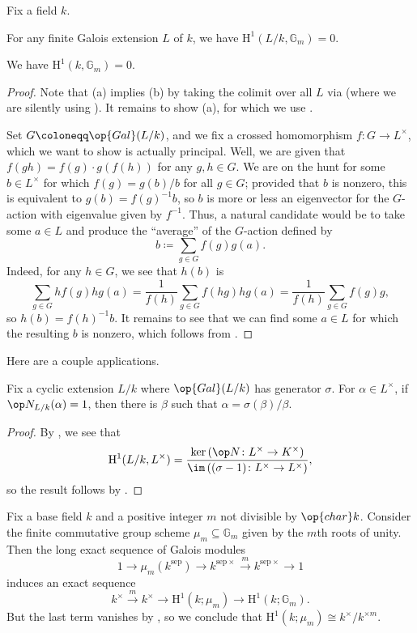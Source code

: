 \documentclass[notes.tex]{subfiles}
\begin{document}
\begin{theorem}[Hilbert 90] \label{thm:h90}
	Fix a field $k$.
	\begin{listalph}
		\item For any finite Galois extension $L$ of $k$, we have $\mathrm H^1(L/k,\mathbb G_m)=0$.
		\item We have $\mathrm H^1(k,\mathbb G_m)=0$.
	\end{listalph}
\end{theorem}
\begin{proof}
	Note that (a) implies (b) by taking the colimit over all $L$ via  (where we are silently using ). It remains to show (a), for which we use .
	
	Set $G\coloneqq\op{Gal}(L/k)$, and we fix a crossed homomorphism $f\colon G\to L^\times$, which we want to show is actually principal. Well, we are given that $f(gh)=f(g)\cdot g(f(h))$ for any $g,h\in G$. We are on the hunt for some $b\in L^\times$ for which $f(g)=g(b)/b$ for all $g\in G$; provided that $b$ is nonzero, this is equivalent to $g(b)=f(g)^{-1}b$, so $b$ is more or less an eigenvector for the $G$-action with eigenvalue given by $f^{-1}$. Thus, a natural candidate would be to take some $a\in L$ and produce the ``average'' of the $G$-action defined by
	\[b\coloneqq\sum_{g\in G}f(g)g(a).\]
	Indeed, for any $h\in G$, we see that $h(b)$ is
	\[\sum_{g\in G}hf(g)hg(a)=\frac1{f(h)}\sum_{g\in G}f(hg)hg(a)=\frac1{f(h)}\sum_{g\in G}f(g)g,\]
	so $h(b)=f\left(h\right)^{-1}b$. It remains to see that we can find some $a\in L$ for which the resulting $b$ is nonzero, which follows from .
\end{proof}
Here are a couple applications.
\begin{corollary}
	Fix a cyclic extension $L/k$ where $\op{Gal}(L/k)$ has generator $\sigma$. For $\alpha\in L^\times$, if $\op N_{L/k}(\alpha)=1$, then there is $\beta$ such that $\alpha=\sigma(\beta)/\beta$.
\end{corollary}
\begin{proof}
	By , we see that
	\[\mathrm H^1(L/k,L^\times)=\frac{\ker\left(\op N\colon L^\times\to K^\times\right)}{\im\left((\sigma-1)\colon L^\times\to L^\times\right)},\]
	so the result follows by .
\end{proof}
\begin{example}
	Fix a base field $k$ and a positive integer $m$ not divisible by $\op{char}k$. Consider the finite commutative group scheme $\mu_m\subseteq\mathbb G_m$ given by the $m$th roots of unity. Then the long exact sequence of Galois modules
	\[1\to\mu_m(k^{\mathrm{sep}})\to k^{\mathrm{sep}\times}\stackrel m\to k^{\mathrm{sep}\times}\to1\]
	induces an exact sequence
	\[k^\times\stackrel m\to k^\times\to\mathrm H^1(k;\mu_m)\to\mathrm H^1(k;\mathbb G_m).\]
	But the last term vanishes by , so we conclude that $\mathrm H^1(k;\mu_m)\cong k^\times/k^{\times m}$.
\end{example}
\end{document}
